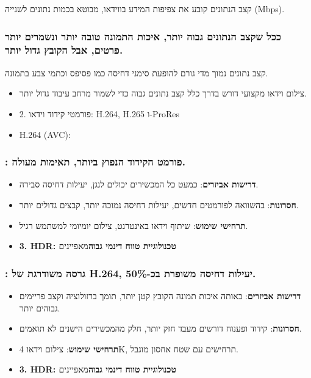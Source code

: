 קצב הנתונים קובע את צפיפות המידע בווידאו, מבוטא בכמות נתונים לשנייה (Mbps).

\subsubsection*{ככל שקצב הנתונים גבוה יותר, איכות התמונה טובה יותר ונשמרים יותר פרטים, אבל הקובץ גדול יותר.}

קצב נתונים נמוך מדי גורם להופעת סימני דחיסה כמו פסיפס וכתמי צבע בתמונה.

\begin{itemize}
  \item צילום וידאו מקצועי דורש בדרך כלל קצב נתונים גבוה כדי לשמור מרחב עיבוד גדול יותר.
  \item 2. פורמטי קידוד וידאו: H.264, H.265 ו-ProRes
  \item H.264 (AVC):
\end{itemize}


\subsubsection*{: פורמט הקידוד הנפוץ ביותר, תאימות מעולה.}

\begin{itemize}
  \item \textbf{דרישות אביזרים}: כמעט כל המכשירים יכולים לנגן, יעילות דחיסה סבירה.
  \item \textbf{חסרונות}: בהשוואה לפורמטים חדשים, יעילות דחיסה נמוכה יותר, קבצים גדולים יותר.
  \item \textbf{תרחישי שימוש}: שיתוף וידאו באינטרנט, צילום יומיומי למשתמש רגיל.
  \item \textbf{3. HDR: טכנולוגיית טווח דינמי גבוה}מאפיינים
\end{itemize}

\subsubsection*{: גרסה משודרגת של H.264, יעילות דחיסה משופרת בכ-50\%.}

\begin{itemize}
  \item \textbf{דרישות אביזרים}: באותה איכות תמונה הקובץ קטן יותר, תומך ברזולוציה וקצב פריימים גבוהים יותר.
  \item \textbf{חסרונות}: קידוד ופענוח דורשים מעבד חזק יותר, חלק מהמכשירים הישנים לא תואמים.
  \item \textbf{תרחישי שימוש}: צילום וידאו 4K, תרחישים עם שטח אחסון מוגבל.
  \item \textbf{3. HDR: טכנולוגיית טווח דינמי גבוה}מאפיינים
\end{itemize}

